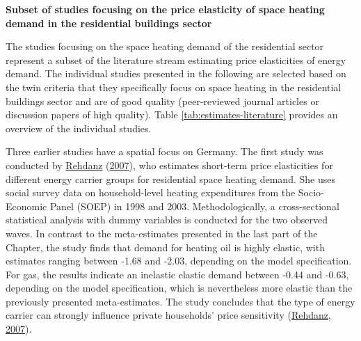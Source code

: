 \documentclass[12pt,twoside]{reedthesis}
\begin{document}
\textbf{Subset of studies focusing on the price elasticity of space heating demand in the residential buildings sector}

The studies focusing on the space heating demand of the residential sector represent a subset of the literature stream estimating price elasticities of energy demand. The individual studies presented in the following are selected based on the twin criteria that they specifically focus on space heating in the residential buildings sector and are of good quality (peer-reviewed journal articles or discussion papers of high quality). Table \ref{tab:estimates-literature} provides an overview of the individual studies.

Three earlier studies have a spatial focus on Germany. The first study was conducted by \protect\hyperlink{ref-rehdanz07}{Rehdanz} (\protect\hyperlink{ref-rehdanz07}{2007}), who estimates short-term price elasticities for different energy carrier groups for residential space heating demand. She uses social survey data on household-level heating expenditures from the Socio-Economic Panel (SOEP) in 1998 and 2003. Methodologically, a cross-sectional statistical analysis with dummy variables is conducted for the two observed waves. In contrast to the meta-estimates presented in the last part of the Chapter, the study finds that demand for heating oil is highly elastic, with estimates ranging between -1.68 and -2.03, depending on the model specification. For gas, the results indicate an inelastic elastic demand between -0.44 and -0.63, depending on the model specification, which is nevertheless more elastic than the previously presented meta-estimates. The study concludes that the type of energy carrier can strongly influence private households' price sensitivity (\protect\hyperlink{ref-rehdanz07}{Rehdanz, 2007}).
\end{document}
